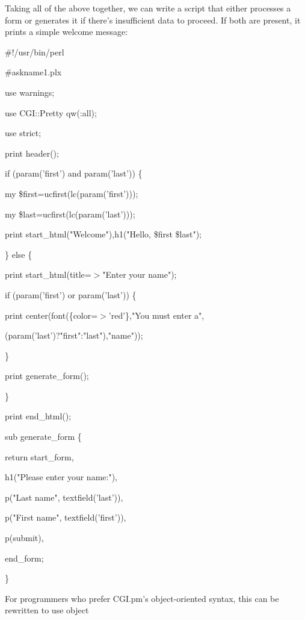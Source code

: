 \documentclass[a4paper,11pt]{book}
\begin{document}
\noindent 

\noindent Taking all of the above together, we can write a script that either processes a form or generates it if there's insufficient data to proceed. If both are present, it prints a simple welcome message:

\noindent 

\noindent \#!/usr/bin/perl

\noindent \#askname1.plx

\noindent use warnings;

\noindent use CGI::Pretty qw(:all);

\noindent use strict;

\noindent 

\noindent print header();

\noindent if (param('first') and param('last')) \{

\noindent my \$first=ucfirst(lc(param('first')));

\noindent my \$last=ucfirst(lc(param('last')));

\noindent print start\_html("Welcome"),h1("Hello, \$first \$last");

\noindent \} else \{

\noindent print start\_html(title=$>$"Enter your name");

\noindent if (param('first') or param('last')) \{

\noindent print center(font(\{color=$>$'red'\},"You must enter a",

\noindent (param('last')?"first":"last"),"name"));

\noindent \}

\noindent print generate\_form();

\noindent \}

\noindent print end\_html();

\noindent 

\noindent sub generate\_form \{

\noindent return start\_form,

\noindent h1("Please enter your name:"),

\noindent p("Last name", textfield('last')),

\noindent p("First name", textfield('first')),

\noindent p(submit),

\noindent end\_form;

\noindent \}

\noindent 

\noindent For programmers who prefer CGI.pm's object-oriented syntax, this can be rewritten to use object
\end{document}

